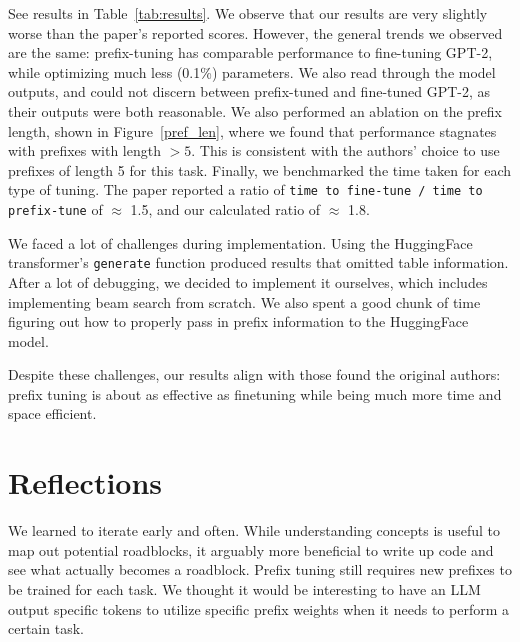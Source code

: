 \documentclass[11pt]{article} %
\begin{document}
See results in Table~\ref{tab:results}. We observe that our results are very slightly worse than the paper's reported scores. However, the general trends we observed are the same: prefix-tuning has comparable performance to fine-tuning GPT-2, while optimizing much less (0.1\%) parameters. We also read through the model outputs, and could not discern between prefix-tuned and fine-tuned GPT-2, as their outputs were both reasonable. We also performed an ablation on the prefix length, shown in Figure~\ref{pref_len}, where we found that performance stagnates with prefixes with length $>5$. This is consistent with the authors' choice to use prefixes of length 5 for this task. Finally, we benchmarked the time taken for each type of tuning. The paper reported a ratio of \texttt{time to fine-tune / time to prefix-tune} of $\approx$ 1.5, and our calculated ratio of $\approx$ 1.8. 

We faced a lot of challenges during implementation. Using the HuggingFace transformer's \texttt{generate} function produced results that omitted table information. After a lot of debugging, we decided to implement it ourselves, which includes implementing beam search from scratch. We also spent a good chunk of time figuring out how to properly pass in prefix information to the HuggingFace model.

Despite these challenges, our results align with those found the original authors: prefix tuning is about as effective as finetuning while being much more time and space efficient.

\section{Reflections}
We learned to iterate early and often. While understanding concepts is useful to map out potential roadblocks, it arguably more beneficial to write up code and see what actually becomes a roadblock. Prefix tuning still requires new prefixes to be trained for each task. We thought it would be interesting to have an LLM output specific tokens to utilize specific prefix weights when it needs to perform a certain task.


\end{document}

